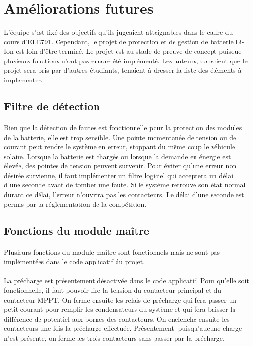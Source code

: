 \section{Améliorations futures}

	\paragraph{}
	L'équipe s'est fixé des objectifs qu'ils jugeaient atteignables dans le cadre du cours d'ELE791. Cependant, le projet de protection et de gestion de batterie Li-Ion est loin d'être terminé. Le projet est au stade de preuve de concept puisque plusieurs fonctions n'ont pas encore été implémenté. Les auteurs, conscient que le projet sera pris par d'autres étudiants, tenaient à dresser la liste des éléments à implémenter.
	
	\subsection{Filtre de détection}
		
		\paragraph{}
		Bien que la détection de fautes est fonctionnelle pour la protection des modules de la batterie, elle est trop sensible. Une pointe momentanée de tension ou de courant peut rendre le système en erreur, stoppant du même coup le véhicule solaire. Lorsque la batterie est chargée ou lorsque la demande en énergie est élevée, des pointes de tension peuvent survenir. Pour éviter qu'une erreur non désirée survienne, il faut implémenter un filtre logiciel qui acceptera un délai d'une seconde avant de tomber une faute. Si le système retrouve son état normal durant ce délai, l'erreur n'ouvrira pas les contacteurs. Le délai d'une seconde est permis par la réglementation de la compétition.

	\subsection{Fonctions du module maître}	
	
		\paragraph{}
		Plusieurs fonctions du module maître sont fonctionnels mais ne sont pas implémentées dans le code applicatif du projet.
		
		\paragraph{}
		La précharge est présentement désactivée dans le code applicatif. Pour qu'elle soit fonctionnelle, il faut pouvoir lire la tension du contacteur principal et du contacteur MPPT. On ferme ensuite les relais de précharge qui fera passer un petit courant pour remplir les condensateurs du système et qui fera baisser la différence de potentiel aux bornes des contacteurs. On enclenche ensuite les contacteurs une fois la précharge effectuée. Présentement, puisqu'aucune charge n'est présente, on ferme les trois contacteurs sans passer par la précharge.
		
